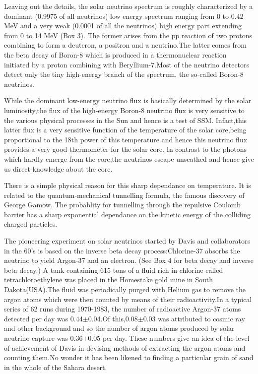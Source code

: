 Leaving out the details, the solar neutrino spectrum is
roughly characterized by a dominant (0.9975 of all neutrinos)
low energy spectrum ranging from 0 to 0.42 MeV and a very weak 
(0.0001 of all the neutrinos)
high energy part extending from 0 to 14 MeV (Box 3). 
The former arises from the 
pp reaction of two protons combining to form a deuteron,
a positron and a neutrino.The latter comes from the beta decay
of Boron-8 which is produced in a thermonuclear reaction
initiated by a proton combining with Beryllium-7.Most of the
neutrino detectors detect only the tiny high-energy branch of
the spectrum, the so-called Boron-8 neutrinos.

While the dominant low-energy neutrino flux is basically 
determined by the solar luminosity,the flux of the high-energy
Boron-8 neutrino flux is very sensitive to the various physical
processes in the Sun and hence is a test of SSM. Infact,this
latter flux is a very sensitive function of the temperature
of the solar core,being proportional to the 18th power of
this temperature and hence this neutrino flux provides 
a very good thermometer for the solar core. In contrast to
the photons which hardly emerge from the core,the neutrinos
escape unscathed and hence give us direct knowledge about
the core.

There is a simple physical reason for this sharp dependance
on temperature. It is related to the quantum-mechanical
tunnelling formula, the famous discovery of George Gamow.
The probablity for tunnelling through the repulsive Coulomb
barrier has a sharp exponential dependance on the kinetic
energy of the colliding charged particles.

The pioneering experiment on solar neutrinos started by Davis
and collaborators in the 60's is based on the inverse beta decay
process:Chlorine-37 absorbs the neutrino to yield Argon-37 and
an electron. (See Box 4 for beta decay and inverse beta decay.)
A tank containing 615 tons of a fluid rich in chlorine
called tetrachloroethylene was placed in the Homestake gold mine
in South Dakota(USA).The fluid was periodically purged with
Helium gas to remove the argon atoms which were then counted
by means of their radioactivity.In a typical series of 62 runs
during 1970-1983, the number of radioactive Argon-37 atoms
detected per day was 0.44$\pm$0.04.Of this,0.08$\pm$0.03 was attributed
to cosmic ray and other background and so the number of argon
atoms produced by solar neutrino capture was 0.36$\pm$0.05 per day.
These numbers give an idea of the level of achievement of Davis
in devising methods of extracting the argon atoms and counting
them.No wonder it has been likened to finding a particular grain
of sand in the whole of the Sahara desert.

